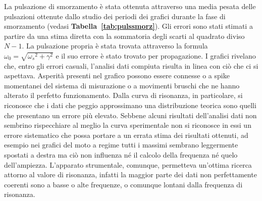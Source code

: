 La pulsazione di smorzamento è stata ottenuta attraverso una media pesata delle pulsazioni ottenute dallo studio dei periodi dei
grafici durante la fase di smorzamento (vedasi \textbf{Tabella~\ref{tab:pulssmorz}}).
Gli errori sono stati stimati a partire da una stima diretta con la sommatoria degli scarti al quadrato diviso $N-1$.
La pulsazione propria è stata trovata attraverso la formula $\omega_0 =\sqrt{{\omega_s} ^ 2 + \gamma ^ 2 }$ e il suo errore è stato trovato per propagazione.
I grafici rivelano che, entro gli errori casuali, l'analisi dati compiuta risulta in linea con ciò che ci si aspettava. Asperità 
presenti nel grafico possono essere connesse o a spike momentanei del sistema di misurazione o a movimenti bruschi che ne hanno
 alterato il perfetto funzionamento. Dalla curva di risonanza, in particolare, si riconosce che i dati che peggio approssimano una
 distribuzione teorica sono quelli che presentano un errore più elevato. Sebbene alcuni risultati dell'analisi dati
 non sembrino rispecchiare al meglio la curva sperimentale non si riconosce in essi un errore sistematico che possa portare a un errata
 stima dei risultati ottenuti, ad esempio nei grafici del moto a regime tutti i massimi sembrano leggermente spostati a destra ma ciò non influenza né il calcolo
 della frequenza né quelo dell'ampiezza. L'apparato strumentale, comunque, permetteva un'ottima
 ricerca attorno al valore di risonanza, infatti la maggior parte dei dati non perfettamente coerenti sono a basse o alte frequenze, o
 comunque lontani dalla frequenza di risonanza.


